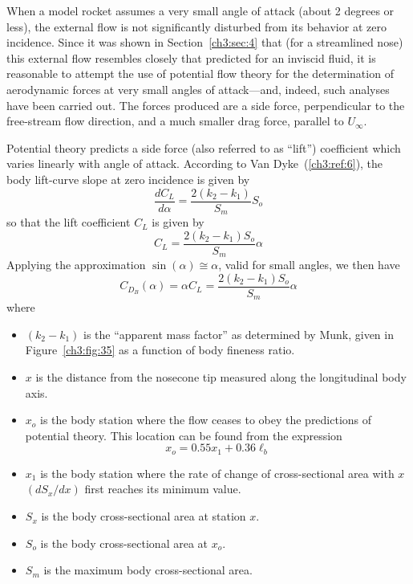 When a model rocket assumes a very small angle of attack (about 2 degrees or
less), the external flow is not significantly disturbed from its behavior at
zero incidence. Since it was shown in Section~\ref{ch3:sec:4} that (for a
streamlined nose) this external flow resembles closely that predicted for an
inviscid fluid, it is reasonable to attempt the use of potential flow theory for
the determination of aerodynamic forces at very small angles of attack---and,
indeed, such analyses have been carried out. The forces produced are a side
force, perpendicular to the free-stream flow direction, and a much smaller drag
force, parallel to $U_\infty$.

Potential theory predicts a side force (also referred to as ``lift'')
coefficient which varies linearly with angle of attack. According to Van
Dyke~(\ref{ch3:ref:6}), the body lift-curve slope at zero incidence is given by
\begin{equation}\label{ch3:eq:137}
\frac{dC_L}{d\alpha} = \frac{2(k_2 - k_1)}{S_m}S_o
\end{equation}
so that the lift coefficient $C_L$ is given by
\begin{equation}\label{ch3:eq:138}
C_L = \frac{2(k_2 - k_1)S_o}{S_m}\alpha
\end{equation}
Applying the approximation $\sin(\alpha) \cong \alpha$, valid for small angles,
we then have
\begin{equation}\label{ch3:eq:139}
C_{D_B}(\alpha) = \alpha C_L = \frac{2(k_2 - k_1)S_o}{S_m}\alpha
\end{equation}
where
\begin{itemize}[leftmargin=2.5em,label={}]
  \item $(k_2 - k_1)$ is the ``apparent mass factor'' as determined by Munk,
  given in Figure~\ref{ch3:fig:35} as a function of body fineness ratio.
  \item $x$ is the distance from the nosecone tip measured along the
  longitudinal body axis.
  \item $x_o$ is the body station where the flow ceases to obey the predictions
  of potential theory. This location can be found from the expression
  \begin{equation}\label{ch3:eq:140}
  x_o = 0.55x_1 + 0.36\ell_b
  \end{equation}
  \item $x_1$ is the body station where the rate of change of cross-sectional
  area with $x$ $(dS_x/dx)$ first reaches its minimum value.
  \item $S_x$ is the body cross-sectional area at station $x$.
  \item $S_o$ is the body cross-sectional area at $x_o$.
  \item $S_m$ is the maximum body cross-sectional area.
\end{itemize}
